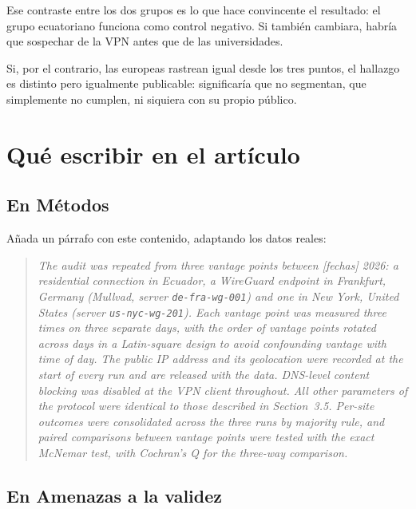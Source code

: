 \documentclass[11pt,a4paper]{article}
\begin{document}
Ese contraste entre los dos grupos es lo que hace convincente el resultado: el grupo ecuatoriano funciona como control negativo. Si también cambiara, habría que sospechar de la VPN antes que de las universidades.

Si, por el contrario, las europeas rastrean igual desde los tres puntos, el hallazgo es distinto pero igualmente publicable: significaría que no segmentan, que simplemente no cumplen, ni siquiera con su propio público.

\section{Qué escribir en el artículo}\label{sec:escribir}

\subsection{En Métodos}

Añada un párrafo con este contenido, adaptando los datos reales:

\begin{quote}
	\small
	\textit{The audit was repeated from three vantage points between [fechas] 2026: a residential connection in Ecuador, a WireGuard endpoint in Frankfurt, Germany (Mullvad, server \texttt{de-fra-wg-001}) and one in New York, United States (server \texttt{us-nyc-wg-201}). Each vantage point was measured three times on three separate days, with the order of vantage points rotated across days in a Latin-square design to avoid confounding vantage with time of day. The public IP address and its geolocation were recorded at the start of every run and are released with the data. DNS-level content blocking was disabled at the VPN client throughout. All other parameters of the protocol were identical to those described in Section~3.5. Per-site outcomes were consolidated across the three runs by majority rule, and paired comparisons between vantage points were tested with the exact McNemar test, with Cochran's Q for the three-way comparison.}
\end{quote}

\subsection{En Amenazas a la validez}
\end{document}
